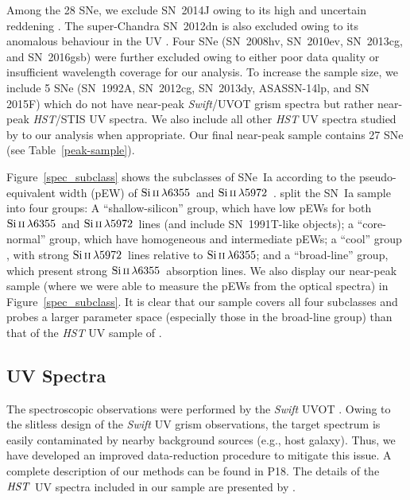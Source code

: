 \documentclass[useAMS,usenatbib]{mn2e}
\newcommand{\Siii}{\ensuremath{\mathrm{Si}\,\textsc{ii}\,\lambda6355}}
\newcommand{\Siiitmp}{\ensuremath{\mathrm{Si}\,\textsc{ii}\,\lambda5972}}
\begin{document}
Among the 28 SNe, we exclude SN~2014J owing to its high and uncertain reddening \citep[e.g.,][]{2014ApJ...784L..12G,2014MNRAS.443.2887F,2014ApJ...788L..21A}. The super-Chandra SN~2012dn is also excluded owing to its anomalous behaviour in the UV \citep{2014ApJ...787...29B}. Four SNe (SN~2008hv, SN~2010ev, SN~2013cg, and SN~2016gsb) were further excluded owing to either poor data quality or insufficient wavelength coverage for our analysis. To increase the sample size, we include 5 SNe (SN~1992A, SN~2012cg, SN~2013dy, ASASSN-14lp, and SN 2015F) which do not have near-peak {\it Swift}/UVOT grism spectra but rather near-peak {\it HST}/STIS UV spectra. We also include all other {\it HST} UV spectra studied by \citet{2016MNRAS.461.1308F} to our analysis when appropriate. Our final near-peak sample contains 27 SNe (see Table~\ref{peak-sample}).

Figure~\ref{spec_subclass} shows the subclasses of SNe~Ia according to the pseudo-equivalent width (pEW) of \Siii\ and \Siiitmp\ \citep{2006PASP..118..560B}. \citet{2006PASP..118..560B} split the SN~Ia sample into four groups: A ``shallow-silicon'' group, which have low pEWs for both \Siii\ and \Siiitmp\ lines (and include SN~1991T-like objects); a ``core-normal'' group, which have homogeneous and intermediate pEWs; a ``cool'' group \citep[similar to the FAINT group in][]{2005ApJ...623.1011B}, with strong \Siiitmp\ lines relative to \Siii; and a ``broad-line'' group, which present strong \Siii\ absorption lines. We also display our near-peak sample (where we were able to measure the pEWs from the optical spectra) in Figure~\ref{spec_subclass}.  It is clear that our sample covers all four subclasses and probes a larger parameter space (especially those in the broad-line group) than that of the {\it HST} UV sample of \citet{2016MNRAS.461.1308F}.

\subsection{UV Spectra}
\label{sec:spectra}
The spectroscopic observations were performed by the {\it Swift} UVOT \citep{2004SPIE.5165..262R,2015MNRAS.449.2514K}. Owing to the slitless design of the {\it Swift} UV grism observations, the target spectrum is easily contaminated by nearby background sources (e.g., host galaxy). Thus, we have developed an improved data-reduction procedure to mitigate this issue. A complete description of our methods can be found in P18. The details of the $\it HST$ UV spectra included in our sample are presented by \citet{2016MNRAS.461.1308F}.
\end{document}
